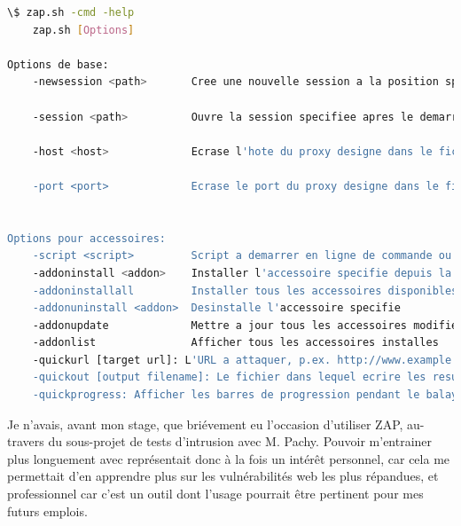 \begin{lstlisting}[language=bash, caption={Options de ZAP en ligne de commande},frame=single mv]
\$ zap.sh -cmd -help
	zap.sh [Options]

Options de base:
	-newsession <path>       Cree une nouvelle session a la position specifiee

	-session <path>          Ouvre la session specifiee apres le demarrage de ZAP

	-host <host>             Ecrase l'hote du proxy designe dans le fichier de configuration

	-port <port>             Ecrase le port du proxy designe dans le fichier de configuration


Options pour accessoires:
	-script <script>         Script a demarrer en ligne de commande ou a charger dans l'interface graphique
	-addoninstall <addon>    Installer l'accessoire specifie depuis la foire aux modules ZAP
	-addoninstallall         Installer tous les accessoires disponibles depuis la foire aux modules de ZAP
	-addonuninstall <addon>  Desinstalle l'accessoire specifie
	-addonupdate             Mettre a jour tous les accessoires modifies depuis la foire aux modules de ZAP
	-addonlist               Afficher tous les accessoires installes
	-quickurl [target url]: L'URL a attaquer, p.ex. http://www.example.com
	-quickout [output filename]: Le fichier dans lequel ecrire les resultats XML
	-quickprogress: Afficher les barres de progression pendant le balayage
\end{lstlisting}

Je n'avais, avant mon stage, que briévement eu l'occasion d'utiliser ZAP, au-travers du sous-projet de tests d'intrusion avec M. Pachy. Pouvoir m'entrainer plus longuement avec représentait donc à la fois un intérêt personnel, car cela me permettait d'en apprendre plus sur les vulnérabilités web les plus répandues, et professionnel car c'est un outil dont l'usage pourrait être pertinent pour mes futurs emplois.

